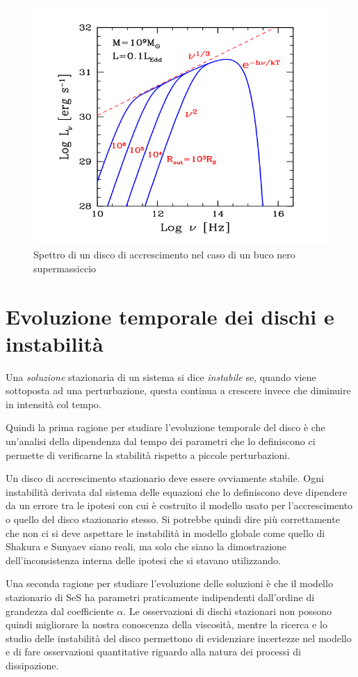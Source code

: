 \documentclass[a4paperbi]{article}
\begin{document}
	\begin{figure}[H]
		\centering
		\includegraphics[width=0.7\linewidth]{SpettroDiscoGhisellini}
		\caption{Spettro di un disco di accrescimento nel caso di un buco nero supermassiccio}
		\label{fig:SpettroDiscoGhisellini}
	\end{figure}	
		
\newpage
\section{Evoluzione temporale dei dischi e instabilità}
	Una \textit{soluzione} stazionaria di un sistema si dice \textit{instabile} se, quando viene sottoposta ad una perturbazione, questa continua a crescere invece che diminuire in intensità col tempo.

	Quindi la prima ragione per studiare l'evoluzione temporale del disco è che un'analisi della dipendenza dal tempo dei parametri che lo definiscono ci permette di verificarne la stabilità rispetto a piccole perturbazioni. 
	
	Un disco di accrescimento stazionario deve essere ovviamente stabile. Ogni instabilità derivata dal sistema delle equazioni che lo definiscono deve dipendere da un errore tra le ipotesi con cui è costruito il modello usato per l'accrescimento o quello del disco stazionario stesso. Si potrebbe quindi dire più correttamente che non ci si deve aspettare le instabilità in modello globale come quello di Shakura e Sunyaev siano reali, ma solo che siano la dimostrazione dell'inconsistenza interna delle ipotesi che si stavano utilizzando.
	
	Una seconda ragione per studiare l'evoluzione delle soluzioni è che il modello stazionario di SeS ha parametri praticamente indipendenti dall'ordine di grandezza dal coefficiente $\alpha$. Le osservazioni di dischi stazionari non possono quindi migliorare la nostra conoscenza della viscosità, mentre la ricerca e lo studio delle instabilità del disco permettono di evidenziare incertezze nel modello e di fare osservazioni quantitative riguardo alla natura dei processi di dissipazione.
	
\end{document}
